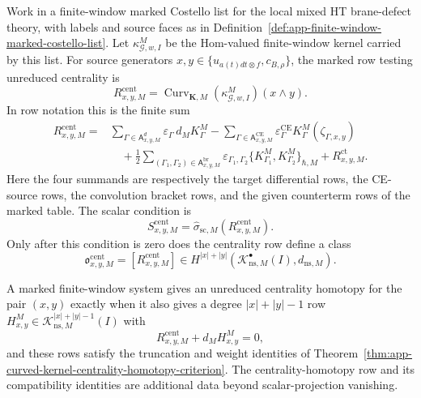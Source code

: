 \begin{prop}
\label{prop:app-marked-row-centrality-homotopy-test}
  Work in a finite-window marked Costello list for the local mixed HT
  brane-defect theory, with labels and source faces as in
  Definition~\ref{def:app-finite-window-marked-costello-list}.  Let
  \(\kappa^M_{\mathcal G,w,I}\) be the Hom-valued finite-window kernel
  carried by this list.  For source generators
  \(x,y\in\{u_{a(t)dt\otimes f},c_{B,\rho}\}\), the marked row testing
  unreduced centrality is
  \[
    R^{\mathrm{cent}}_{x,y,M}
      =
    \operatorname{Curv}_{\mathbf K,M}
      (\kappa^M_{\mathcal G,w,I})(x\wedge y).
  \]
  In row notation this is the finite sum
  \[
  \begin{aligned}
    R^{\mathrm{cent}}_{x,y,M}
      ={}&
      \sum_{\Gamma\in\mathsf A_{x,y,M}^{d}}
        \varepsilon_\Gamma\,d_M K^M_\Gamma
      -\sum_{\Gamma\in\mathsf A_{x,y,M}^{\mathrm{CE}}}
        \varepsilon^{\mathrm{CE}}_\Gamma
        K^M_\Gamma(\zeta_{\Gamma,x,y})  \\
      &\quad
      +\frac12
      \sum_{(\Gamma_1,\Gamma_2)\in
        \mathsf A_{x,y,M}^{\mathrm{br}}}
        \varepsilon_{\Gamma_1,\Gamma_2}
        \{K^M_{\Gamma_1},K^M_{\Gamma_2}\}_{\hbar,M}
      +R^{\mathrm{ct}}_{x,y,M}.
  \end{aligned}
  \]
  Here the four summands are respectively the target differential rows,
  the CE-source rows, the convolution bracket rows, and the given
  counterterm rows of the marked table.  The scalar condition is
  \[
    S^{\mathrm{cent}}_{x,y,M}
      =
    \widehat\sigma_{\mathrm{sc},M}
      (R^{\mathrm{cent}}_{x,y,M}).
  \]
  Only after this condition is zero does the centrality row define a class
  \[
    \mathfrak o^{\mathrm{cent}}_{x,y,M}
      =
    [R^{\mathrm{cent}}_{x,y,M}]
      \in
    H^{|x|+|y|}
      (\mathcal K^\bullet_{\mathrm{ns},M}(I),d_{\mathrm{ns},M}).
  \]

  A marked finite-window system gives an unreduced
  centrality homotopy for the pair \((x,y)\) exactly when it also
  gives a degree \(|x|+|y|-1\) row
  \(H^M_{x,y}\in\mathcal K_{\mathrm{ns},M}^{|x|+|y|-1}(I)\) with
  \[
    R^{\mathrm{cent}}_{x,y,M}+d_M H^M_{x,y}=0,
  \]
  and these rows satisfy the truncation and weight identities of
  Theorem~\ref{thm:app-curved-kernel-centrality-homotopy-criterion}.  The
  centrality-homotopy row and its compatibility identities are additional
  data beyond scalar-projection vanishing.


\end{prop}
